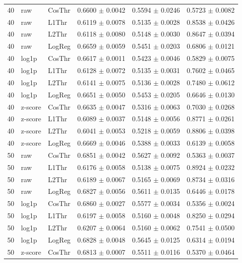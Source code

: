 \begin{longtable}{rllccc}
40 & raw & CosThr & 0.6600 $\pm$ 0.0042 & 0.5594 $\pm$ 0.0246 & 0.5723 $\pm$ 0.0082 \\
40 & raw & L1Thr & 0.6119 $\pm$ 0.0078 & 0.5135 $\pm$ 0.0028 & 0.8538 $\pm$ 0.0426 \\
40 & raw & L2Thr & 0.6118 $\pm$ 0.0080 & 0.5148 $\pm$ 0.0030 & 0.8647 $\pm$ 0.0394 \\
40 & raw & LogReg & 0.6659 $\pm$ 0.0059 & 0.5451 $\pm$ 0.0203 & 0.6806 $\pm$ 0.0121 \\
40 & log1p & CosThr & 0.6617 $\pm$ 0.0011 & 0.5423 $\pm$ 0.0046 & 0.5829 $\pm$ 0.0075 \\
40 & log1p & L1Thr & 0.6128 $\pm$ 0.0072 & 0.5135 $\pm$ 0.0031 & 0.7602 $\pm$ 0.0465 \\
40 & log1p & L2Thr & 0.6141 $\pm$ 0.0075 & 0.5136 $\pm$ 0.0028 & 0.7480 $\pm$ 0.0612 \\
40 & log1p & LogReg & 0.6651 $\pm$ 0.0050 & 0.5453 $\pm$ 0.0205 & 0.6646 $\pm$ 0.0130 \\
40 & z-score & CosThr & 0.6635 $\pm$ 0.0047 & 0.5316 $\pm$ 0.0063 & 0.7030 $\pm$ 0.0268 \\
40 & z-score & L1Thr & 0.6089 $\pm$ 0.0037 & 0.5148 $\pm$ 0.0056 & 0.8771 $\pm$ 0.0261 \\
40 & z-score & L2Thr & 0.6041 $\pm$ 0.0053 & 0.5218 $\pm$ 0.0059 & 0.8806 $\pm$ 0.0398 \\
40 & z-score & LogReg & 0.6669 $\pm$ 0.0046 & 0.5388 $\pm$ 0.0033 & 0.6139 $\pm$ 0.0058 \\
50 & raw & CosThr & 0.6851 $\pm$ 0.0042 & 0.5627 $\pm$ 0.0092 & 0.5363 $\pm$ 0.0037 \\
50 & raw & L1Thr & 0.6176 $\pm$ 0.0058 & 0.5138 $\pm$ 0.0075 & 0.8924 $\pm$ 0.0232 \\
50 & raw & L2Thr & 0.6189 $\pm$ 0.0067 & 0.5165 $\pm$ 0.0069 & 0.8734 $\pm$ 0.0316 \\
50 & raw & LogReg & 0.6827 $\pm$ 0.0056 & 0.5611 $\pm$ 0.0135 & 0.6446 $\pm$ 0.0178 \\
50 & log1p & CosThr & 0.6860 $\pm$ 0.0027 & 0.5577 $\pm$ 0.0034 & 0.5356 $\pm$ 0.0024 \\
50 & log1p & L1Thr & 0.6197 $\pm$ 0.0058 & 0.5160 $\pm$ 0.0048 & 0.8250 $\pm$ 0.0294 \\
50 & log1p & L2Thr & 0.6207 $\pm$ 0.0064 & 0.5160 $\pm$ 0.0062 & 0.7541 $\pm$ 0.0500 \\
50 & log1p & LogReg & 0.6828 $\pm$ 0.0048 & 0.5645 $\pm$ 0.0125 & 0.6314 $\pm$ 0.0194 \\
50 & z-score & CosThr & 0.6813 $\pm$ 0.0007 & 0.5511 $\pm$ 0.0116 & 0.5370 $\pm$ 0.0464 \\

\end{longtable}
